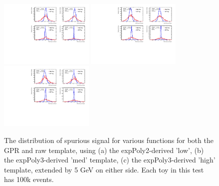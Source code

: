 \begin{figure} 
\begin{center}
  \includegraphics[width=0.4\textwidth]{figures/background/gpr/validation/padded/ToyTest_FitSigVals_lowpT_100k_noSig}   
  \includegraphics[width=0.4\textwidth]{figures/background/gpr/validation/padded/ToyTest_FitSigVals_medpT_100k_noSig}   
  \includegraphics[width=0.4\textwidth]{figures/background/gpr/validation/padded/ToyTest_FitSigVals_highpT_100k_noSig}   
\caption{The distribution of spurious signal for various functions for both the GPR and raw template, using (a) the expPoly2-derived 'low', (b) the expPoly3-derived 'med' template, (c) the expPoly3-derived 'high' template, extended by 5 GeV on either side. Each toy in this test has 100k events.}
\label{fig:padded_lowpt_100k_noSig}
\end{center}
\end{figure}

